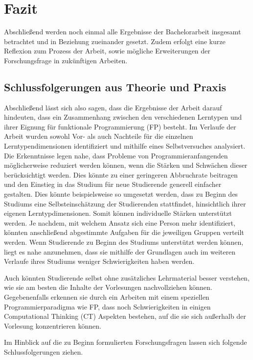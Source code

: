 \clearpage
\section{Fazit}
\label{sec:conclusion}

Abschließend werden noch einmal alle Ergebnisse der Bachelorarbeit insgesamt betrachtet und in Beziehung zueinander gesetzt. Zudem erfolgt eine kurze Reflexion zum Prozess der Arbeit, sowie mögliche Erweiterungen der Forschungsfrage in zukünftigen Arbeiten.

\subsection{Schlussfolgerungen aus Theorie und Praxis}
Abschließend lässt sich also sagen, dass die Ergebnisse der Arbeit darauf hindeuten, dass ein Zusammenhang zwischen den verschiedenen Lerntypen und ihrer Eignung für funktionale Programmierung (FP) besteht.
Im Verlaufe der Arbeit wurden sowohl Vor- als auch Nachteile für die einzelnen Lerntypendimensionen identifiziert und mithilfe eines Selbstversuches analysiert. Die Erkenntnisse legen nahe, dass Probleme von Programmieranfangenden möglicherweise reduziert werden können, wenn die Stärken und Schwächen dieser berücksichtigt werden. Dies könnte zu einer geringeren Abbruchrate beitragen und den Einstieg in das Studium für neue Studierende generell einfacher gestalten.
Dies könnte beispielsweise so umgesetzt werden, dass zu Beginn des Studiums eine Selbsteinschätzung der Studierenden stattfindet, hinsichtlich ihrer eigenen Lerntypdimensionen. Somit können individuelle Stärken unterstützt werden. Je nachdem, mit welchem Ansatz sich eine Person mehr identifiziert, könnten anschließend abgestimmte Aufgaben für die jeweiligen Gruppen verteilt werden. Wenn Studierende zu Beginn des Studiums unterstützt werden können, liegt es nahe anzunehmen, dass sie mithilfe der Grundlagen auch im weiteren Verlaufe ihres Studiums weniger Schwierigkeiten haben werden.

Auch könnten Studierende selbst ohne zusätzliches Lehrmaterial besser verstehen, wie sie am besten die Inhalte der Vorlesungen nachvollziehen können. Gegebenenfalls erkennen sie durch ein Arbeiten mit einem speziellen Programmierparadigma wie FP, dass noch Schwierigkeiten in einigen Computational Thinking (CT) Aspekten bestehen, auf die sie sich außerhalb der Vorlesung konzentrieren können.

Im Hinblick auf die zu Beginn formulierten Forschungsfragen lassen sich folgende Schlussfolgerungen ziehen.


